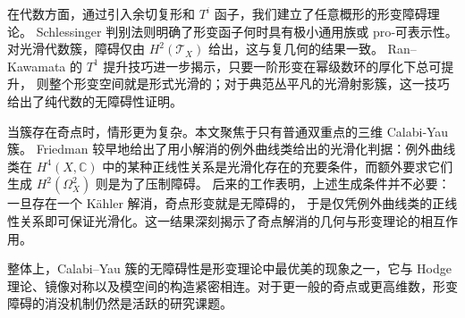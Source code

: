 在代数方面，通过引入余切复形和 \(T^i\) 函子，我们建立了任意概形的形变障碍理论。
Schlessinger 判别法则明确了形变函子何时具有极小通用族或 pro‑可表示性。
对光滑代数簇，障碍仅由 \(H^2(\mathcal T_X)\) 给出，这与复几何的结果一致。
Ran–Kawamata 的 \(T^1\) 提升技巧进一步揭示，只要一阶形变在幂级数环的厚化下总可提升，
则整个形变空间就是形式光滑的；对于典范丛平凡的光滑射影簇，这一技巧给出了纯代数的无障碍性证明。

当簇存在奇点时，情形更为复杂。本文聚焦于只有普通双重点的三维 Calabi‑Yau 簇。
Friedman 较早地给出了用小解消的例外曲线类给出的光滑化判据：例外曲线类在 \(H^4(X,\mathbb C)\) 中的某种正线性关系是光滑化存在的充要条件，而额外要求它们生成 \(H^2(\Omega_X^2)\) 则是为了压制障碍。
后来的工作表明，上述生成条件并不必要：一旦存在一个 Kähler 解消，奇点形变就是无障碍的，
于是仅凭例外曲线类的正线性关系即可保证光滑化。这一结果深刻揭示了奇点解消的几何与形变理论的相互作用。

整体上，Calabi–Yau 簇的无障碍性是形变理论中最优美的现象之一，它与 Hodge 理论、镜像对称以及模空间的构造紧密相连。对于更一般的奇点或更高维数，形变障碍的消没机制仍然是活跃的研究课题。